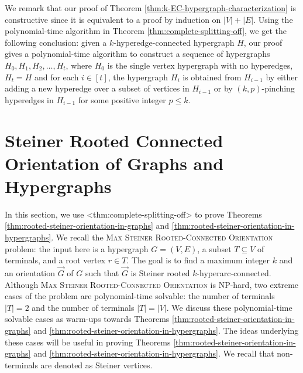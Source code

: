 \documentclass{article}
\def\Cref#1{<#1>}%
\begin{document}
We remark that our proof of Theorem \ref{thm:k-EC-hypergraph-characterization} is constructive since it is equivalent to a proof by induction on $|V|+|E|$. 
Using the polynomial-time algorithm in Theorem \ref{thm:complete-splitting-off}, we get the following conclusion: given a $k$-hyperedge-connected hypergraph $H$, our proof gives a polynomial-time algorithm to construct a sequence of hypergraphs $H_0, H_1, H_2, \ldots, H_t$, where $H_0$ is the single vertex hypergraph with no hyperedges, $H_t=H$ and for each $i\in [t]$, the hypergraph $H_i$ is obtained from $H_{i-1}$ by either adding a new hyperedge over a subset of vertices in $H_{i-1}$ or by $(k,p)$-pinching hyperedges in $H_{i-1}$ for some positive integer $p\le k$. 
\section{Steiner Rooted Connected Orientation of Graphs and Hypergraphs}
\label{sec:rooted-steiner-connected-orientations}
In this section, we use  \Cref{thm:complete-splitting-off} to
prove Theorems \ref{thm:rooted-steiner-orientation-in-graphs} and \ref{thm:rooted-steiner-orientation-in-hypergraphs}. 
We recall the \textsc{Max Steiner Rooted-Connected Orientation} problem: the input here is a hypergraph $G=(V, E)$, a subset $T\subseteq V$ of terminals, and a root vertex $r\in T$. The goal is to find a maximum integer $k$ and an orientation $\overrightarrow{G}$ of $G$ such that $\overrightarrow{G}$ is Steiner rooted $k$-hyperarc-connected. 
Although \textsc{Max Steiner Rooted-Connected Orientation} is NP-hard, two extreme cases of the problem are polynomial-time solvable: the number of terminals $|T|=2$ and the number of terminals $|T|=|V|$. We discuss these polynomial-time solvable cases as warm-ups towards Theorems \ref{thm:rooted-steiner-orientation-in-graphs} and \ref{thm:rooted-steiner-orientation-in-hypergraphs}. The ideas underlying these cases will be useful in proving Theorems \ref{thm:rooted-steiner-orientation-in-graphs} and \ref{thm:rooted-steiner-orientation-in-hypergraphs}. 
We recall that non-terminals are denoted as Steiner vertices. 
\end{document}

